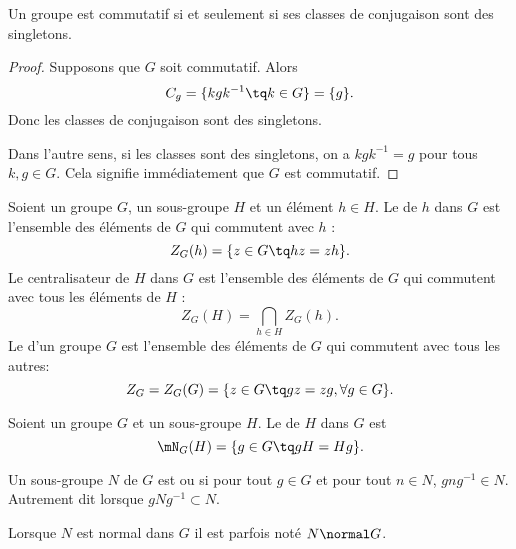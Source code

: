 \begin{lemma}       \label{LEMooQYBJooYwMwGM}
	Un groupe est commutatif si et seulement si ses classes de conjugaison sont des singletons.
\end{lemma}

\begin{proof}
	Supposons que \( G\) soit commutatif. Alors
	\begin{equation}
		C_g=\{ kgk^{-1}\tq k\in G \}=\{ g \}.
	\end{equation}
	Donc les classes de conjugaison sont des singletons.

	Dans l'autre sens, si les classes sont des singletons, on a \( kgk^{-1}=g\) pour tous \( k,g\in G\). Cela signifie immédiatement que \( G\) est commutatif.
\end{proof}

\begin{definition}         \label{defGroupeCentre}
	Soient un groupe \( G\), un sous-groupe \( H\) et un élément \( h\in H\). Le  de \( h\) dans \( G\) est l'ensemble des éléments de \( G\) qui commutent avec \( h\) :
	\begin{equation}
		Z_G(h)=\{z\in G\tq hz=zh\}.
	\end{equation}
	Le centralisateur de \( H\) dans \( G\) est l'ensemble des éléments de \( G\) qui commutent avec tous les éléments de \( H\) :
	\begin{equation}
		Z_G(H)=\bigcap_{h\in H}Z_G(h).
	\end{equation}
	Le  d'un groupe \( G\) est l'ensemble des éléments de \( G\) qui commutent avec tous les autres:
	\begin{equation}
		Z_G=Z_G(G)=\{ z\in G\tq gz=zg , \forall g\in G \}.
	\end{equation}
\end{definition}

\begin{definition}          \label{DEFooZTSMooBislIy}
	Soient un groupe \( G\) et un sous-groupe \( H\). Le  de \( H\) dans \( G\) est
	\begin{equation}
		\mN_G(H)=\{ g\in G\tq gH=Hg \}.
	\end{equation}
\end{definition}

\begin{definition}                      \label{DEFooNIIMooFkZgvX}
	Un sous-groupe \( N\) de \( G\) est  ou  si pour tout \( g\in G\) et pour tout \( n\in N\), \( gng^{-1}\in N\). Autrement dit lorsque \( gNg^{-1}\subset N\).

	Lorsque \( N\) est normal dans \( G\) il est parfois noté \( N\normal G\).
\end{definition}

